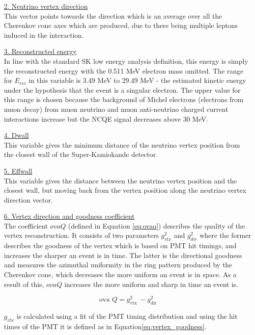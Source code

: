 \noindent
\underline{2. Neutrino vertex direction}\\
\noindent
This vector points towards the direction which is an average over all the Cherenkov cone axes which are produced, due to there being multiple leptons induced in the interaction.


\noindent
\underline{3. Reconstructed energy}\\
\noindent 
In line with the standard SK low energy analysis definition, this energy is simply the reconstructed energy with the 0.511 MeV electron mass omitted. The range for $E_{rec}$ in this variable is 3.49 MeV to 29.49 MeV - the estimated kinetic energy under the hypothesis that the event is a singular electron. The upper value for this range is chosen because the background of Michel electrons (electrons from muon decay) from muon neutrino and muon anti-neutrino charged current interactions increase but the NCQE signal decreases above 30 MeV. 

\noindent
\underline{4. Dwall}\\
\noindent 
This variable gives the minimum distance of the neutrino vertex position from the closest wall of the Super-Kamiokande detector.

\noindent
\underline{5. Effwall}\\
\noindent 
This variable gives the distance between the neutrino vertex position and the closest wall, but moving back from the vertex position along the neutrino vertex direction vector.

\noindent
\underline{6. Vertex direction and goodness coefficient}\\
\noindent 
The coefficient $ovaQ$ (defined in Equation \ref{eq:ovaq}) describes the quality of the vertex reconstruction. It consists of two parameters $g^2_{vtx}$ and $g^2_{dir}$ where the former describes the goodness of the vertex which is based on PMT hit timings, and increases the sharper an event is in time. The latter is the directional goodness and measures the azimuthal uniformity in the ring pattern produced by the Cherenkov cone, which decreases the more uniform an event is in space. As a result of this, $ovaQ$ increases the more uniform and sharp in time an event is.

\begin{equation}
    \text { ova } Q=g_{\text {vtx }}^{2}-g_{\text {dir }}^{2}
    \label{eq:ovaq}
\end{equation}

$g_{vtx}$ is calculated using a fit of the PMT timing distribution and using the hit times of the PMT it is defined as in Equation\ref{eq:vertex_goodness}.

